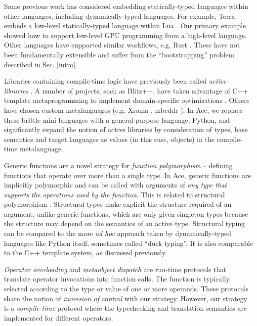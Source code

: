 \documentclass[9pt,preprint]{sigplanconf}
\begin{document}
Some previous work has considered embedding statically-typed languages within other languages, including dynamically-typed languages. For example, Terra embeds a low-level statically-typed language within Lua \cite{terra}. Our primary example showed how to support low-level GPU programming from a high-level language. Other languages have supported similar workflows, e.g. Rust \cite{rustgpu}. These have not been fundamentally extensible and suffer from the ``bootstrapping'' problem described in Sec. \ref{intro}. 

Libraries containing compile-time logic have previously been called {\it active libraries} \cite{activelibraries}. A number of  projects, such as Blitz++, have taken advantage of C++ template metaprogramming to implement domain-specific optimizations \cite{veldhuizen2000blitz++}. Others have chosen custom metalanguages (e.g. Xroma \cite{activelibraries}, mbeddr \cite{mbeddr}). In Ace, we replace these brittle mini-languages with a general-purpose language, Python, and significantly expand the notion of active libraries by consideration of types, base semantics and target languages as values (in this case, objects) in the compile-time metalanguage.

Generic functions are a novel strategy for {\it function polymorphism} -- defining functions that operate over more than a single type. In Ace, generic functions are implicitly polymorphic and can be called with arguments of {\it any type that supports the operations used by the function}. This is related to structural polymorphism \cite{malayeri2009structural}. Structural types make explicit the structure required of an argument, unlike generic functions, which are only given singleton types because the structure may depend on the semantics of an active type. 
Structural typing can be compared to the more \emph{ad hoc} approach taken by dynamically-typed languages like Python itself, sometimes called ``duck typing''. It is also comparable to the C++ template system, as discussed previously. 

{\it Operator overloading} \cite{vanWijngaarden:Mailloux:Peck:Koster:Sintzoff:Lindsey:Meertens:Fisker:acta:1975} and {\it metaobject dispatch} \cite{Kiczales91} are run-time protocols that translate operator invocations into function calls. The function is typically selected according to the type or value of one or more operands. These protocols share the notion of {\it inversion of control} with our strategy. However, our strategy is a {\it compile-time} protocol where the typechecking and translation semantics are implemented for different operators. %
\end{document}
